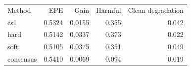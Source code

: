 \begin{tabular}{lrrrr}\toprule
Method & EPE & Gain & Harmful & Clean degradation \\
cs1 & 0.5324 & 0.0155 & 0.355 & 0.042 \\
hard & 0.5142 & 0.0337 & 0.373 & 0.022 \\
soft & 0.5105 & 0.0375 & 0.351 & 0.049 \\
consensus & 0.5410 & 0.0069 & 0.094 & 0.019 \\
\bottomrule\end{tabular}
